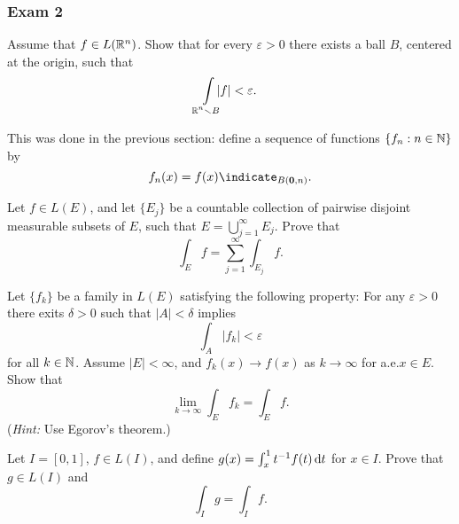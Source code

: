 \subsubsection{Exam 2}
\setcounter{exercise}{0}
\setcounter{equation}{0}

\begin{problem}
  Assume that \(f\in L(\mathbb{R}^n)\). Show that for every \(\varepsilon>0\)
  there exists a ball \(B\), centered at the origin, such that
  \[
    \int\limsclap{\bbR^n\setminus B}|f|<\varepsilon.
  \]
\end{problem}
\begin{solution}
  This was done in the previous section: define a sequence of functions
  \(\{f_n:n\in\mathbb{N}\}\) by
  \[
    f_n(x)=f(x)\indicate_{B(\mathbf{0},n)}.
  \]
\end{solution}

\begin{problem}
  Let \(f\in L(E)\), and let \(\{E_j\}\) be a countable collection of
  pairwise disjoint measurable subsets of \(E\), such that
  \(E=\bigcup_{j=1}^\infty E_j\). Prove that
  \[
    \int_E f=\sum_{j=1}^\infty\int_{E_j}f.
  \]
\end{problem}
\begin{solution}
\end{solution}

\begin{problem}
  Let \(\{f_k\}\) be a family in \(L(E)\) satisfying the following
  property: For any \(\varepsilon>0\) there exits \(\delta>0\) such that
  \(|A|<\delta\) implies
  \[
    \int_A |f_k|<\varepsilon
  \]
  for all \(k\in\mathbb{N}\). Assume \(|E|<\infty\), and \(f_k(x)\to f(x)\) as
  \(k\to\infty\) for a.e.\@ \(x\in E\). Show that
  \[
    \lim_{k\to\infty}\int_E f_k=\int_E f.
  \]
  (\emph{Hint:} Use Egorov's theorem.)
\end{problem}
\begin{solution}
\end{solution}

\begin{problem}
  Let \(I=[0,1]\), \(f\in L(I)\), and define
  \(g(x)=\int_x^1 t^{-1}f(t) \mathop{}\!\mathrm{d} t\) for \(x\in I\). Prove that
  \(g\in L(I)\) and
  \[
    \int_I g=\int_I f.
  \]
\end{problem}
\begin{solution}
\end{solution}

